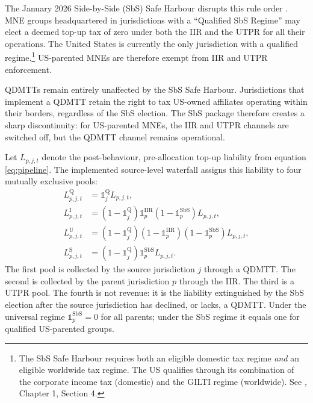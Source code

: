 \documentclass[11pt,a4paper]{article}
\begin{document}
The January 2026 Side-by-Side (SbS) Safe Harbour disrupts this rule order \citep{oecd2026}. MNE groups headquartered in jurisdictions with a ``Qualified SbS Regime'' may elect a deemed top-up tax of zero under both the IIR and the UTPR for all their operations. The United States is currently the only jurisdiction with a qualified regime.\footnote{The SbS Safe Harbour requires both an eligible domestic tax regime \emph{and} an eligible worldwide tax regime. The US qualifies through its combination of the corporate income tax (domestic) and the GILTI regime (worldwide). See \citet{oecd2026}, Chapter 1, Section 4.} US-parented MNEs are therefore exempt from IIR and UTPR enforcement.

QDMTTs remain entirely unaffected by the SbS Safe Harbour. Jurisdictions that implement a QDMTT retain the right to tax US-owned affiliates operating within their borders, regardless of the SbS election. The SbS package therefore creates a sharp discontinuity: for US-parented MNEs, the IIR and UTPR channels are switched off, but the QDMTT channel remains operational. 


Let $L_{p,j,t}$ denote the post-behaviour, pre-allocation top-up liability from equation \eqref{eq:pipeline}. The implemented source-level waterfall assigns this liability to four mutually exclusive pools:
\begin{align}
L_{p,j,t}^{\text{Q}} &= \mathbb{1}_j^{\text{Q}} L_{p,j,t}, \label{eq:qdmtt_sbs} \\
L_{p,j,t}^{\text{I}} &= (1-\mathbb{1}_j^{\text{Q}})\mathbb{1}_p^{\text{IIR}}(1-\mathbb{1}_p^{\text{SbS}})L_{p,j,t}, \label{eq:iir_sbs} \\
L_{p,j,t}^{\text{U}} &= (1-\mathbb{1}_j^{\text{Q}})(1-\mathbb{1}_p^{\text{IIR}})(1-\mathbb{1}_p^{\text{SbS}})L_{p,j,t}, \label{eq:utpr_sbs} \\
L_{p,j,t}^{\text{S}} &= (1-\mathbb{1}_j^{\text{Q}})\mathbb{1}_p^{\text{SbS}}L_{p,j,t}. \label{eq:sbs_extinguish}
\end{align}
The first pool is collected by the source jurisdiction $j$ through a QDMTT. The second is collected by the parent jurisdiction $p$ through the IIR. The third is a UTPR pool. The fourth is not revenue: it is the liability extinguished by the SbS election after the source jurisdiction has declined, or lacks, a QDMTT. Under the universal regime $\mathbb{1}_p^{\text{SbS}}=0$ for all parents; under the SbS regime it equals one for qualified US-parented groups.
\end{document}
